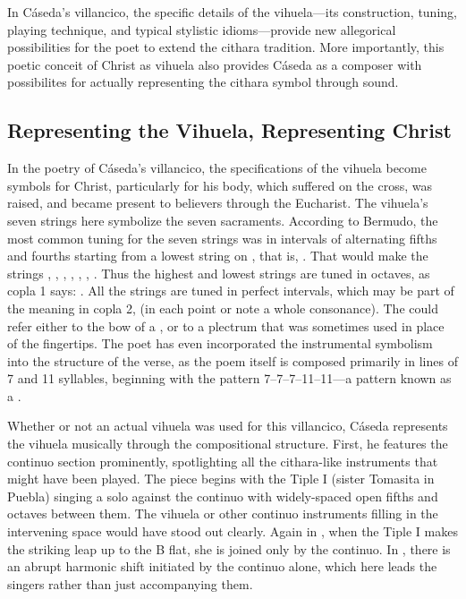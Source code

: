 
In Cáseda's villancico, the specific details of the vihuela---its construction,
tuning, playing technique, and typical stylistic idioms---provide new
allegorical possibilities for the poet to extend the cithara tradition.
More importantly, this poetic conceit of Christ as vihuela also provides Cáseda
as a composer with possibilites for actually representing the cithara symbol
through sound.

\subsection{Representing the Vihuela, Representing Christ}

In the poetry of Cáseda's villancico, the specifications of the vihuela become
symbols for Christ, particularly for his body, which suffered on the cross, was
raised, and became present to believers through the Eucharist.
The vihuela's seven strings here symbolize the seven sacraments.
According to Bermudo, the most common tuning for the seven strings was in
intervals of alternating fifths and fourths starting from a lowest string on 
, that is, .%
    \Autocite[\folios{109\recto--109\verso}]{Bermudo:Declaracion}
That would make the strings , , ,
, , , .
Thus the highest and lowest strings are tuned in octaves, as copla 1 says:
.
All the strings are tuned in perfect intervals, which may be part of the
meaning in copla 2,  (in each point
or note a whole consonance).
The  could refer either to the bow of a ,
or to a plectrum that was sometimes used in place of the fingertips.
The poet has even incorporated the instrumental symbolism into the structure of
the verse, as the poem itself is composed primarily in lines of 7 and 11
syllables, beginning with the pattern 7--7--7--11--11---a pattern known as a
.%
    \Autocite{Lauer:Metrification}


Whether or not an actual vihuela was used for this villancico, Cáseda
represents the vihuela musically through the compositional structure.
First, he features the continuo section prominently, spotlighting all the
cithara-like instruments that might have been played.
The piece begins with the Tiple I (sister Tomasita in Puebla) singing a solo
against the continuo with widely-spaced open fifths and octaves between them.
The vihuela or other continuo instruments filling in the intervening space
would have stood out clearly.
Again in , when the Tiple I makes the striking leap up to the
B flat, she is joined only by the continuo.
In , there is an abrupt harmonic shift initiated by the continuo
alone, which here leads the singers rather than just accompanying them.

